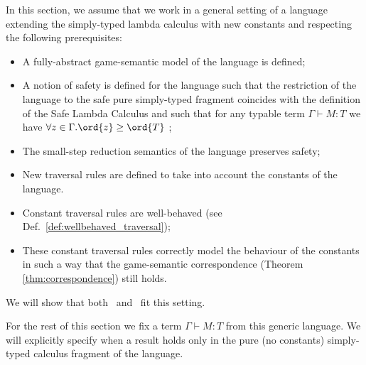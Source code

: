In this section, we assume that we work in a general setting of a
language extending the simply-typed lambda calculus with new
constants and respecting the following prerequisites:
\begin{itemize}
\item A fully-abstract game-semantic model of the language is
defined;
\item A notion of safety is defined for the language such that the
restriction of the language to the safe pure simply-typed
fragment coincides with the definition of the Safe Lambda
Calculus and such that for any typable term $\Gamma \vdash M :
T$ we have $\forall z \in \Gamma . \ord{z} \geq \ord{T}$ ;
\item The small-step reduction semantics of the language preserves safety;
\item New traversal rules are defined to take into account the constants of the language.
\item Constant traversal rules are well-behaved (see Def.\
\ref{def:wellbehaved_traversal});
\item These constant traversal rules correctly model the behaviour of the constants in such a way that the game-semantic correspondence (Theorem
\ref{thm:correspondence}) still holds.
\end{itemize}

We will show that both \pcf\ and \ialgol\ fit this setting.

For the rest of this section we fix a term $\Gamma \vdash M : T$
from this generic language. We will explicitly specify when a result
holds only in the pure (\ie no constants) simply-typed calculus
fragment of the language.

